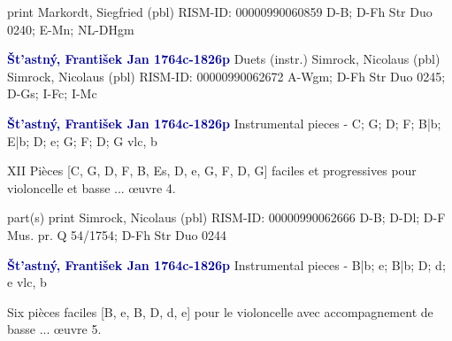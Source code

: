 \documentclass[twocolumn]{book}
\begin{document}
\newline print
\newline Markordt, Siegfried  (pbl)
\newline RISM-ID: 00000990060859
\newline D-B; D-Fh  Str Duo 0240; E-Mn; NL-DHgm
\newline \par \vspace{7pt} \textcolor{darkblue}{\textbf{Št'astný, František Jan  1764c-1826p}}
\newline Duets (instr.)
\newline Simrock, Nicolaus  (pbl)
\newline Simrock, Nicolaus  (pbl)
\newline RISM-ID: 00000990062672
\newline A-Wgm; D-Fh  Str Duo 0245; D-Gs; I-Fc; I-Mc
\newline \par \vspace{7pt} \textcolor{darkblue}{\textbf{Št'astný, František Jan  1764c-1826p}}
\newline Instrumental pieces - C; G; D; F; B|b; E|b; D; e; G; F; D; G
\newline vlc, b
\newline \begin{itshape}XII Pièces [C, G, D, F, B, Es, D, e, G, F, D, G] faciles et progressives pour violoncelle et basse ... œuvre 4.\end{itshape} 
\newline \textcolor{darkblue}{}  part(s)
\newline print
\newline Simrock, Nicolaus  (pbl)
\newline RISM-ID: 00000990062666
\newline D-B; D-Dl; D-F  Mus. pr. Q 54/1754; D-Fh  Str Duo 0244
\newline \par \vspace{7pt} \textcolor{darkblue}{\textbf{Št'astný, František Jan  1764c-1826p}}
\newline Instrumental pieces - B|b; e; B|b; D; d; e
\newline vlc, b
\newline \begin{itshape}Six pièces faciles [B, e, B, D, d, e] pour le violoncelle avec accompagnement de basse ... œuvre 5.\end{itshape} 
\end{document}

